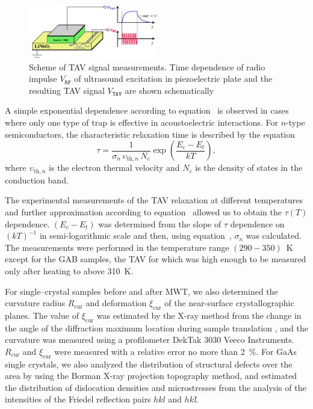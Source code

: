\documentclass[10pt]{iopart}
\begin{document}
\begin{figure}
\includegraphics[width=0.5\textwidth]{fig2}
\caption{\label{figTAV}
Scheme of TAV signal  measurements.
Time dependence of radio impulse $V_\mathtt{RF}$ of ultrasound excitation in piezoelectric plate and the resulting TAV signal $V_\mathtt{TAV}$ are shown schematically
}%
\end{figure}

A simple exponential dependence according to equation~ is observed in cases where only one type of trap is effective in acoustoelectric interactions.
For $n$-type semiconductors, the characteristic relaxation time is described by the equation \cite{OstrovPAN,OstrovskiiSST}
\begin{equation}\label{eqPANtau}
  \tau=\frac{1}{\sigma_n\,\upsilon_{\mathrm{th},n}\,N_c}\exp\left(\frac{E_c-E_t}{kT}\right),
\end{equation}
where
$\upsilon_{\mathrm{th},n}$ is the electron thermal velocity and
$N_c$ is the density of states in the conduction band.



The experimental measurements of the TAV relaxation at different temperatures and further approximation according
to equation~
allowed us to obtain the $\tau(T)$ dependence.
$(E_c-E_t)$ was determined from the slope of $\tau$ dependence on $(kT)^{-1}$ in semi-logarithmic scale
and then, using equation~, $\sigma_n$ was calculated.
The measurements were performed in the temperature range $(290-350)$~K except for the GAB samples,
the TAV for which was high enough to be measured only after heating to above 310~K.

For single--crystal samples  before and after MWT, we also determined the curvature radius $R_\mathrm{cur}$
and deformation $\xi_\mathrm{cur}$ of the near-surface crystallographic planes.
The value of  $\xi_\mathrm{cur}$ was estimated by the X-ray method from the change in the angle of the diffraction
maximum location  during sample translation \cite{Godwod},
and the curvature was measured using a profilometer DekTak 3030 Veeco Instruments.
$R_\mathrm{cur}$ and $\xi_\mathrm{cur}$ were measured with a relative error no more than 2~\%.
For GaAs single crystals, we also analyzed the distribution of structural defects
over the area by using the Borman X-ray projection topography method,
and estimated the distribution of dislocation  densities and microstresses from the
analysis of the intensities of the Friedel reflection pairs $hkl$ and $hk$\emph{\={l}}.
\end{document}
